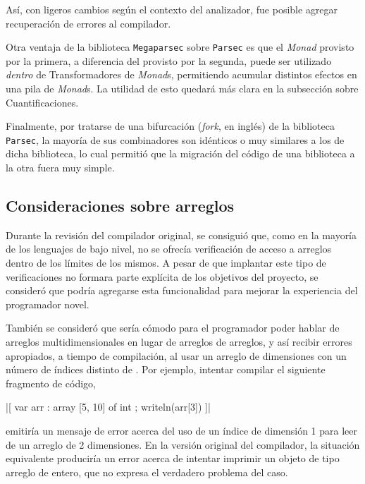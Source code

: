 Así, con ligeros cambios según el contexto del analizador, fue posible agregar
recuperación de errores al compilador.

Otra ventaja de la biblioteca \texttt{Megaparsec} sobre \texttt{Parsec} es que
el \emph{Monad} provisto por la primera, a diferencia del provisto por la
segunda, puede ser utilizado \emph{dentro} de Transformadores de \emph{Monad}s,
permitiendo acumular distintos efectos en una pila de \emph{Monad}s. La utilidad
de esto quedará más clara en la subsección sobre Cuantificaciones.

Finalmente, por tratarse de una bifurcación (\emph{fork}, en inglés) de la
biblioteca \texttt{Parsec}, la mayoría de sus combinadores son idénticos o muy
similares a los de dicha biblioteca, lo cual permitió que la migración del
código de una biblioteca a la otra fuera muy simple.

\subsection{Consideraciones sobre arreglos}

Durante la revisión del compilador original, se consiguió que, como en la
mayoría de los lenguajes de bajo nivel, no se ofrecía verificación de acceso a
arreglos dentro de los límites de los mismos. A pesar de que implantar este tipo
de verificaciones no formara parte explícita de los objetivos del proyecto, se
consideró que podría agregarse esta funcionalidad para mejorar la experiencia
del programador novel.

También se consideró que sería cómodo para el programador poder hablar de
arreglos multidimensionales en lugar de arreglos de arreglos, y así recibir
errores apropiados, a tiempo de compilación, al usar un arreglo de 
dimensiones con un número de índices distinto de . Por ejemplo,
intentar compilar el siguiente fragmento de código,

\begin{gracielacode}
|[ var arr : array [5, 10] of int
;  writeln(arr[3])
]|
\end{gracielacode}

emitiría un mensaje de error acerca del uso de un índice de dimensión 1 para
leer de un arreglo de 2 dimensiones. En la versión original del compilador, la
situación equivalente produciría un error acerca de intentar imprimir un objeto
de tipo arreglo de entero, que no expresa el verdadero problema del caso.

